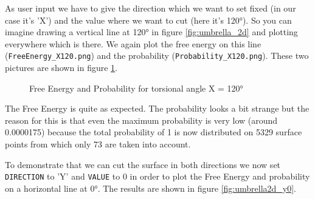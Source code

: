 \documentclass[a4paper,11pt]{scrartcl}
\begin{document}
As user input we have to give the direction which we want to set fixed (in our case it's 'X') and the value where we want to cut (here it's 120°). So you can imagine drawing a vertical line at 120° in figure \ref{fig:umbrella_2d} and plotting everywhere which is there. We again plot the free energy on this line (\texttt{FreeEnergy\_X120.png}) and the probability (\texttt{Probability\_X120.png}). These two pictures are shown in figure \ref{fig:umbrella2d_x120}.

\begin{figure} [htb]
	\caption{Free Energy and Probability for torsional angle X = 120°}
	\label{fig:umbrella2d_x120}
\end{figure}

The Free Energy is quite as expected. The probability looks a bit strange but the reason for this is that even the maximum probability is very low (around 0.0000175) because the total probability of 1 is now distributed on 5329 surface points from which only 73 are taken into account.

To demonstrate that we can cut the surface in both directions we now set \texttt{DIRECTION} to 'Y' and \texttt{VALUE} to 0 in order to plot the Free Energy and probability on a horizontal line at 0°. The results are shown in figure \ref{fig:umbrella2d_y0}.
\end{document}
